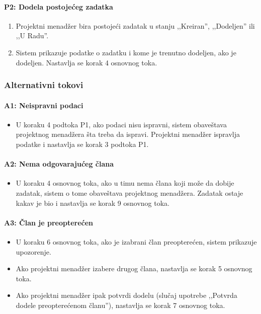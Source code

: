 \paragraph*{P2: Dodela postojećeg zadatka}
\begin{enumerate}
    \item Projektni menadžer bira postojeći zadatak u stanju ,,Kreiran'', ,,Dodeljen'' ili ,,U Radu''.
    \item Sistem prikazuje podatke o zadatku i kome je trenutno dodeljen, ako je dodeljen. Nastavlja se korak 4 osnovnog toka.
\end{enumerate}

\subsubsection*{Alternativni tokovi}

\paragraph*{A1: Neispravni podaci}
\begin{itemize}
    \item U koraku 4 podtoka P1, ako podaci nisu ispravni, sistem obaveštava projektnog menadžera šta treba da ispravi. Projektni menadžer ispravlja podatke i nastavlja se korak 3 podtoka P1.
\end{itemize}

\paragraph*{A2: Nema odgovarajućeg člana}
\begin{itemize}
    \item U koraku 4 osnovnog toka, ako u timu nema člana koji može da dobije zadatak, sistem o tome obaveštava projektnog menadžera. Zadatak ostaje kakav je bio i nastavlja se korak 9 osnovnog toka.
\end{itemize}

\paragraph*{A3: Član je preopterećen}
\begin{itemize}
    \item U koraku 6 osnovnog toka, ako je izabrani član preopterećen, sistem prikazuje upozorenje.
    \item Ako projektni menadžer izabere drugog člana, nastavlja se korak 5 osnovnog toka.
    \item Ako projektni menadžer ipak potvrdi dodelu (slučaj upotrebe ,,Potvrda dodele preopterećenom članu''), nastavlja se korak 7 osnovnog toka.
\end{itemize}


